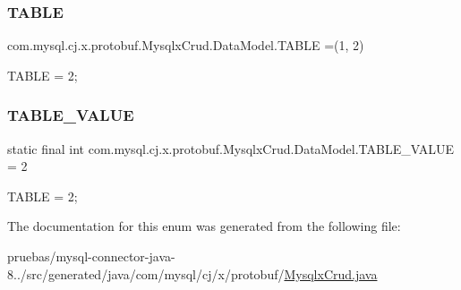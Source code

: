 \subsubsection{\texorpdfstring{T\+A\+B\+LE}{TABLE}}
{\footnotesize\ttfamily com.\+mysql.\+cj.\+x.\+protobuf.\+Mysqlx\+Crud.\+Data\+Model.\+T\+A\+B\+LE =(1, 2)}

{\ttfamily T\+A\+B\+LE = 2;} \mbox{\label{enumcom_1_1mysql_1_1cj_1_1x_1_1protobuf_1_1_mysqlx_crud_1_1_data_model_ae5fdd8346e00f9cd984eae15087e82c6}} 
\subsubsection{\texorpdfstring{T\+A\+B\+L\+E\+\_\+\+V\+A\+L\+UE}{TABLE\_VALUE}}
{\footnotesize\ttfamily  static  final int com.\+mysql.\+cj.\+x.\+protobuf.\+Mysqlx\+Crud.\+Data\+Model.\+T\+A\+B\+L\+E\+\_\+\+V\+A\+L\+UE = 2\hspace{0.3cm}{\ttfamily [static]}}

{\ttfamily T\+A\+B\+LE = 2;} 

The documentation for this enum was generated from the following file\+:\begin{DoxyCompactItemize}
\item 
pruebas/mysql-\/connector-\/java-\/8../src/generated/java/com/mysql/cj/x/protobuf/\mbox{\hyperlink{_mysqlx_crud_8java}{Mysqlx\+Crud.\+java}}\end{DoxyCompactItemize}
